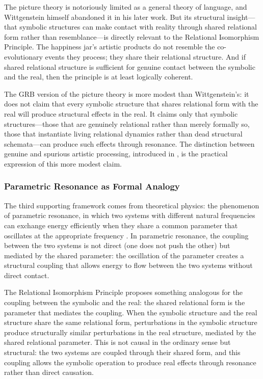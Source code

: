 The picture theory is notoriously limited as a general theory of language, and Wittgenstein himself abandoned it in his later work. But its structural insight---that symbolic structures can make contact with reality through shared relational form rather than resemblance---is directly relevant to the Relational Isomorphism Principle. The happiness jar's artistic products do not resemble the co-evolutionary events they process; they share their relational structure. And if shared relational structure is sufficient for genuine contact between the symbolic and the real, then the principle is at least logically coherent.

The GRB version of the picture theory is more modest than Wittgenstein's: it does not claim that every symbolic structure that shares relational form with the real will produce structural effects in the real. It claims only that  symbolic structures---those that are genuinely relational rather than merely formally so, those that instantiate living relational dynamics rather than dead structural schemata---can produce such effects through resonance. The distinction between genuine and spurious artistic processing, introduced in , is the practical expression of this more modest claim.

\subsubsection{Parametric Resonance as Formal Analogy}
\label{p15:subsubsec:parametric}

\noindent
The third supporting framework comes from theoretical physics: the phenomenon of parametric resonance, in which two systems with different natural frequencies can exchange energy efficiently when they share a common parameter that oscillates at the appropriate frequency \parencite{kuramoto1984}. In parametric resonance, the coupling between the two systems is not direct (one does not push the other) but mediated by the shared parameter: the oscillation of the parameter creates a structural coupling that allows energy to flow between the two systems without direct contact.

The Relational Isomorphism Principle proposes something analogous for the coupling between the symbolic and the real: the shared relational form is the parameter that mediates the coupling. When the symbolic structure and the real structure share the same relational form, perturbations in the symbolic structure produce structurally similar perturbations in the real structure, mediated by the shared relational parameter. This is not causal in the ordinary sense but structural: the two systems are coupled through their shared form, and this coupling allows the symbolic operation to produce real effects through resonance rather than direct causation.

